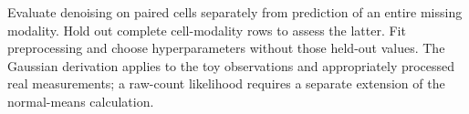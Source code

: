 Evaluate denoising on paired cells separately from prediction of an entire
missing modality. Hold out complete cell-modality rows to assess the latter.
Fit preprocessing and choose hyperparameters without those held-out values.
The Gaussian derivation applies to the toy observations and appropriately
processed real measurements; a raw-count likelihood requires a separate
extension of the normal-means calculation.

